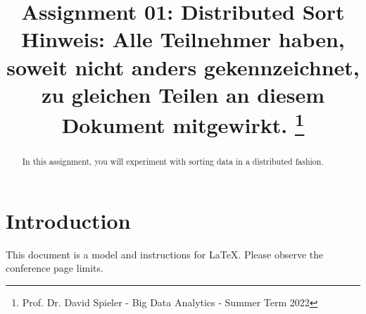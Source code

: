 \documentclass[conference]{IEEEtran}
\begin{document}
\title{Assignment 01: Distributed Sort\\
{\footnotesize Hinweis: Alle Teilnehmer haben, soweit nicht anders gekennzeichnet, zu gleichen Teilen an diesem Dokument mitgewirkt.}
\thanks{Prof. Dr. David Spieler - Big Data Analytics - Summer Term 2022}
}

\author{
\and
{}
\and
{}
}

\maketitle

\begin{abstract}
In this assignment, you will experiment with sorting data in a distributed fashion.
\end{abstract}

\section{Introduction}
This document is a model and instructions for \LaTeX.
Please observe the conference page limits. 


\end{document}
